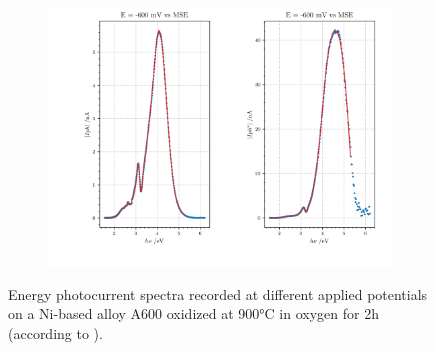 \documentclass[10pt, 3p, sort&compress]{elsarticle}
\newcommand{\coef}{0.1}
\begin{document}
\begin{figure}[htpb]
\begin{subfigure}{\coef\textwidth}
	 	\includegraphics[width=\textwidth]{Anusara-690-600mV.png}
	 	\caption{}
	 	\label{fig:data_srisrual3}
	\end{subfigure}
	
	\caption{Energy photocurrent spectra recorded at different applied potentials on a Ni-based alloy A600 oxidized at 900°C in oxygen for 2h (according to \citep{srisrual2013}).}
	\label{fig:data_srisrual}
\end{figure}
\end{document}
